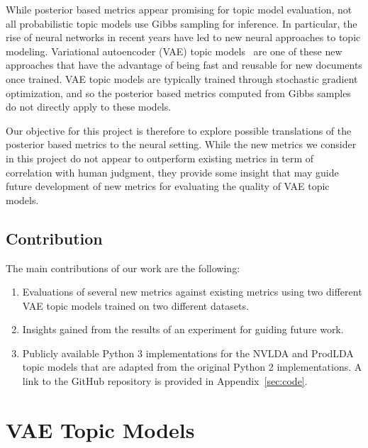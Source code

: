 \documentclass[10pt]{article}
\begin{document}
While posterior based metrics appear promising for topic model evaluation, not all probabilistic topic models use Gibbs sampling for inference. In particular, the rise of neural networks in recent years have led to new neural approaches to topic modeling. Variational autoencoder (VAE) topic models~\cite{Miao:2015,Srivastava:2017} are one of these new approaches that have the advantage of being fast and reusable for new documents once trained. VAE topic models are typically trained through stochastic gradient optimization, and so the posterior based metrics computed from Gibbs samples do not directly apply to these models.

Our objective for this project is therefore to explore possible translations of the posterior based metrics to the neural setting. While the new metrics we consider in this project do not appear to outperform existing metrics in term of correlation with human judgment, they provide some insight that may guide future development of new metrics for evaluating the quality of VAE topic models.

\subsection{Contribution}

The main contributions of our work are the following:
\begin{enumerate}

\item
Evaluations of several new metrics against existing metrics using two different VAE topic models trained on two different datasets.

\item
Insights gained from the results of an experiment for guiding future work.

\item
Publicly available Python 3 implementations for the NVLDA and ProdLDA topic models that are adapted from the original Python 2 implementations. A link to the GitHub repository is provided in Appendix~\ref{sec:code}.

\end{enumerate}

\section{VAE Topic Models}
\end{document}
